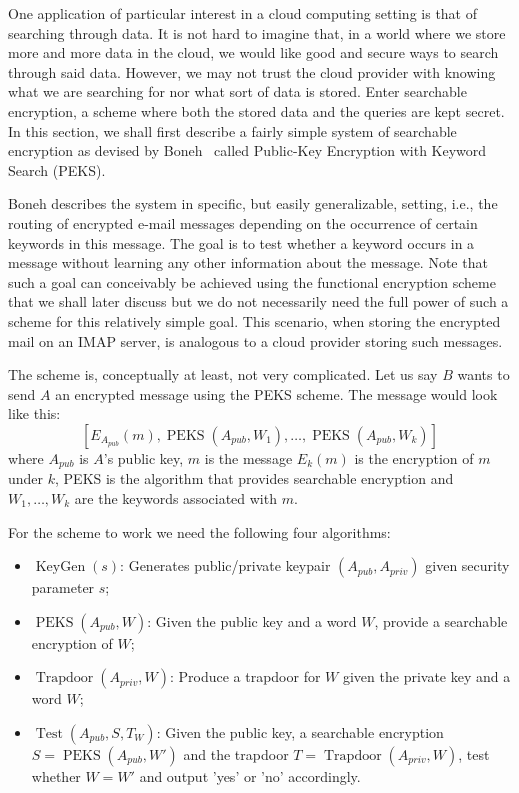 \documentclass[11pt, a4paper]{article}
\newcommand{\op}[1]{\operatorname{#1}}
\begin{document}
One application of particular interest in a cloud computing setting is that of searching through data.
It is not hard to imagine that, in a world where we store more and more data in the cloud, we would like good and secure ways to search through said data.
However, we may not trust the cloud provider with knowing what we are searching for nor what sort of data is stored.
Enter searchable encryption, a scheme where both the stored data and the queries are kept secret.
In this section, we shall first describe a fairly simple system of searchable encryption as devised by Boneh~\cite{boneh2004public} called Public-Key Encryption with Keyword Search (PEKS).

Boneh describes the system in specific, but easily generalizable, setting, i.e., the routing of encrypted e-mail messages depending on the occurrence of certain keywords in this message.
The goal is to test whether a keyword occurs in a message without learning any other information about the message.
Note that such a goal can conceivably be achieved using the functional encryption scheme that we shall later discuss but we do not necessarily need the full power of such a scheme for this relatively simple goal. This scenario, when storing the encrypted mail on an IMAP server, is analogous to a cloud provider storing such messages.

The scheme is, conceptually at least, not very complicated. Let us say $B$ wants to send $A$ an encrypted message using the PEKS scheme. The message would look like this:
\[
    \left[ E_{A_{pub}}(m), \op{PEKS}(A_{pub}, W_1), \dots, \op{PEKS}(A_{pub}, W_k) \right]
\]
where $A_{pub}$ is $A$'s public key, $m$ is the message $E_k(m)$ is the encryption of $m$ under $k$, PEKS is the algorithm that provides searchable encryption and $W_1, \dots, W_k$ are the keywords associated with $m$.

For the scheme to work we need the following four algorithms:
\begin{itemize}
    \item $\op{KeyGen}(s)$: Generates public/private keypair $(A_{pub}, A_{priv})$ given security parameter $s$;
    \item $\op{PEKS}(A_{pub},W)$: Given the public key and a word $W$, provide a searchable encryption of $W$;
    \item $\op{Trapdoor}(A_{priv},W)$: Produce a trapdoor for $W$ given the private key and a word $W$;
    \item $\op{Test}(A_{pub},S,T_W)$: Given the public key, a searchable encryption $S = \op{PEKS}(A_{pub}, W')$ and the trapdoor $T = \op{Trapdoor}(A_{priv}, W)$, test whether $W = W'$ and output 'yes' or 'no' accordingly.
\end{itemize}
\end{document}

